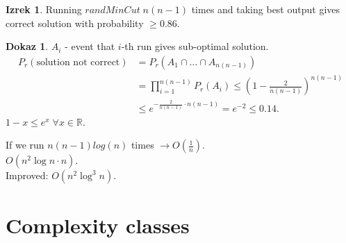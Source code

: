 \documentclass[a4paper, 12pt]{book}
\theoremstyle{definition}
\newtheorem{theorem}[counter]{Izrek}
\newtheorem{pro}[counter]{Dokaz}
\theoremstyle{remark}
\newcommand{\R}{\mathbb{R}}
\begin{document}
\begin{theorem}
  Running $randMinCut \; n(n-1)$ times and taking best output gives correct solution with probability $\geq 0.86$.
\end{theorem}
\begin{pro}
  $A_i$ - event that $i$-th run gives sub-optimal solution.
  \begin{align*}
    P_r(\text{solution not correct}) &= P_r(A_1 \cap \dots \cap A_{n(n-1)}) \\
    &= \prod_{i=1}^{n(n-1)} P_r(A_i) \leq (1 - \frac{2}{n(n-1)})^{n(n-1)} \\
    &\leq e^{-\frac{2}{n(n-1)} \cdot n(n-1)} = e^{-2} \leq 0.14.
  \end{align*}
  $1 - x \leq e^x \; \forall x \in \R$.
\end{pro}
If we run $n(n-1) log(n)$ times $\to O\left(\frac{1}{n}\right)$. \\
$O\left(n^2 \log n \cdot n\right)$. \\
Improved: $O\left(n^2 \log^3 n\right)$.



\chapter{Complexity classes}
\end{document}
